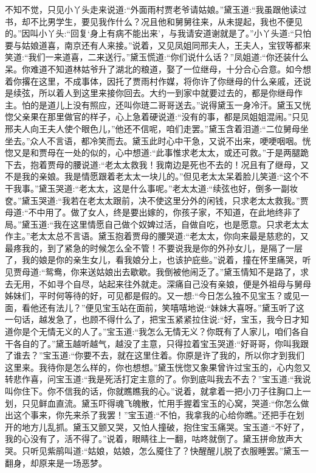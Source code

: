 \begin{parag}
    不知不觉，只见小丫头走来说道:“外面雨村贾老爷请姑娘。”黛玉道:“我虽跟他读过书，却不比男学生，要见我作什么？况且他和舅舅往来，从未提起，我也不便见的。”因叫小丫头:“回复‘身上有病不能出来’，与我请安道谢就是了。”小丫头道:“只怕要与姑娘道喜，南京还有人来接。”说着，又见凤姐同邢夫人，王夫人，宝钗等都来笑道:“我们一来道喜，二来送行。”黛玉慌道:“你们说什么话？”凤姐道:“你还装什么呆。你难道不知道林姑爷升了湖北的粮道，娶了一位继母，十分合心合意。如今想着你撂在这里，不成事体，因托了贾雨村作媒，将你许了你继母的什么亲戚，还说是续弦，所以着人到这里来接你回去。大约一到家中就要过去的，都是你继母作主。怕的是道儿上没有照应，还叫你琏二哥哥送去。”说得黛玉一身冷汗。黛玉又恍惚父亲果在那里做官的样子，心上急着硬说道:“没有的事，都是凤姐姐混闹。”只见邢夫人向王夫人使个眼色儿，”他还不信呢，咱们走罢。”黛玉含着泪道:“二位舅母坐坐去。”众人不言语，都冷笑而去。黛玉此时心中干急，又说不出来，哽哽咽咽。恍惚又是和贾母在一处的似的，心中想道:“此事惟求老太太，或还可救。”于是两腿跪下去，抱着贾母的腰说道:“老太太救我！我南边是死也不去的！况且有了继母，又不是我的亲娘。我是情愿跟着老太太一块儿的。”但见老太太呆着脸儿笑道:“这个不干我事。”黛玉哭道:“老太太，这是什么事呢。”老太太道:“续弦也好，倒多一副妆奁。”黛玉哭道:“我若在老太太跟前，决不使这里分外的闲钱，只求老太太救我。”贾母道:“不中用了。做了女人，终是要出嫁的，你孩子家，不知道，在此地终非了局。”黛玉道:“我在这里情愿自己做个奴婢过活，自做自吃，也是愿意。只求老太太作主。”老太太总不言语。黛玉抱着贾母的腰哭道:“老太太，你向来最是慈悲的，又最疼我的，到了紧急的时候怎么全不管！不要说我是你的外孙女儿，是隔了一层了，我的娘是你的亲生女儿，看我娘分上，也该护庇些。”说着，撞在怀里痛哭，听见贾母道:“鸳鸯，你来送姑娘出去歇歇。我倒被他闹乏了。”黛玉情知不是路了，求去无用，不如寻个自尽，站起来往外就走。深痛自己没有亲娘，便是外祖母与舅母姊妹们，平时何等待的好，可见都是假的。又一想:“今日怎么独不见宝玉？或见一面，看他还有法儿？”便见宝玉站在面前，笑嘻嘻地说:“妹妹大喜呀。”黛玉听了这一句话，越发急了，也顾不得什么了，把宝玉紧紧拉住说:“好，宝玉，我今日才知道你是个无情无义的人了。”宝玉道:“我怎么无情无义？你既有了人家儿，咱们各自干各自的了。”黛玉越听越气，越没了主意，只得拉着宝玉哭道:“好哥哥，你叫我跟了谁去？”宝玉道:“你要不去，就在这里住着。你原是许了我的，所以你才到我们这里来。我待你是怎么样的，你也想想。”黛玉恍惚又象果曾许过宝玉的，心内忽又转悲作喜，问宝玉道:“我是死活打定主意的了。你到底叫我去不去？”宝玉道:“我说叫你住下。你不信我的话，你就瞧瞧我的心。”说着，就拿着一把小刀子往胸口上一划，只见鲜血直流。黛玉吓得魂飞魄散，忙用手握着宝玉的心窝，哭道:“你怎么做出这个事来，你先来杀了我罢！”宝玉道:“不怕，我拿我的心给你瞧。”还把手在划开的地方儿乱抓。黛玉又颤又哭，又怕人撞破，抱住宝玉痛哭。宝玉道:“不好了，我的心没有了，活不得了。”说着，眼睛往上一翻，咕咚就倒了。黛玉拼命放声大哭。只听见紫鹃叫道:“姑娘，姑娘，怎么魇住了？快醒醒儿脱了衣服睡罢。”黛玉一翻身，却原来是一场恶梦。
\end{parag}


